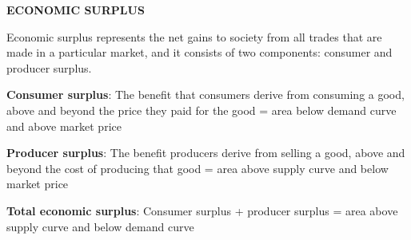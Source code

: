 \documentclass[landscape]{slides}
\begin{document}
\begin{slide}

\end{slide}

\begin{slide}
\begin{center}
{\bf ECONOMIC SURPLUS}
\end{center}

Economic surplus represents the net gains to society from all trades that are made in a particular market, and it consists of two components: consumer and producer surplus.

{\bf Consumer surplus}:
The benefit that consumers derive from consuming a good, above and beyond the price they paid for the good = area below demand curve and above market price

{\bf Producer surplus}:
The benefit producers derive from selling a good, above and beyond the cost of producing that good =
area above supply curve and below market price

{\bf Total economic surplus}:
Consumer
surplus + producer surplus = area above supply curve and below demand curve

\end{slide}

\begin{slide}

\end{slide}



%
%
%
%
%
%
\end{document}

